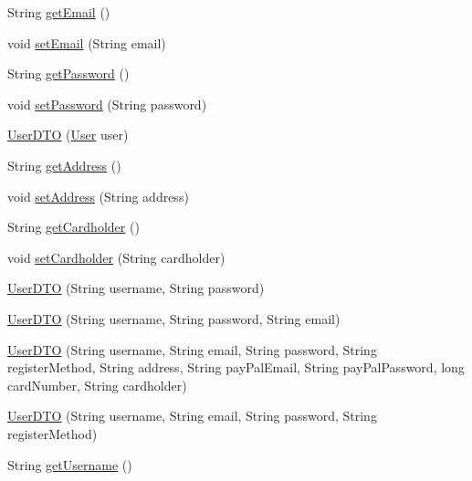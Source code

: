 \begin{DoxyCompactItemize}
\item 
String \mbox{\hyperlink{class_s_p_q_1_1dto_1_1_user_d_t_o_a67038ab8bab7cb7119ece00bcb20a360}{get\+Email}} ()
\item 
void \mbox{\hyperlink{class_s_p_q_1_1dto_1_1_user_d_t_o_a3e41397e229b7f0398232747d97d6d5e}{set\+Email}} (String email)
\item 
String \mbox{\hyperlink{class_s_p_q_1_1dto_1_1_user_d_t_o_a955f436e60336683283a6fcd6fc5f874}{get\+Password}} ()
\item 
void \mbox{\hyperlink{class_s_p_q_1_1dto_1_1_user_d_t_o_a35bd2d50e194e3d923e8adcf229e5a3e}{set\+Password}} (String password)
\item 
\mbox{\hyperlink{class_s_p_q_1_1dto_1_1_user_d_t_o_a40cad7b1dea2117ed4cb0e69fdc6b929}{User\+D\+TO}} (\mbox{\hyperlink{class_s_p_q_1_1data_1_1_user}{User}} user)
\item 
String \mbox{\hyperlink{class_s_p_q_1_1dto_1_1_user_d_t_o_a5234f9e12bcda79c32c4aec80de40ad2}{get\+Address}} ()
\item 
void \mbox{\hyperlink{class_s_p_q_1_1dto_1_1_user_d_t_o_a9ea48b87767eb765aac4f10d0cb9d53a}{set\+Address}} (String address)
\item 
String \mbox{\hyperlink{class_s_p_q_1_1dto_1_1_user_d_t_o_a82fe9a242f18d3cb62735cee648e71d9}{get\+Cardholder}} ()
\item 
void \mbox{\hyperlink{class_s_p_q_1_1dto_1_1_user_d_t_o_a3627efce4d0873f1e706e8ad65a28506}{set\+Cardholder}} (String cardholder)
\item 
\mbox{\hyperlink{class_s_p_q_1_1dto_1_1_user_d_t_o_ad73df6daa2dd8fc4615a5b154acc229b}{User\+D\+TO}} (String username, String password)
\item 
\mbox{\hyperlink{class_s_p_q_1_1dto_1_1_user_d_t_o_ad7df1249da1b9fdc0b383a4b96b50eae}{User\+D\+TO}} (String username, String password, String email)
\item 
\mbox{\hyperlink{class_s_p_q_1_1dto_1_1_user_d_t_o_ad9a6a079da473fe91114b91f0383196f}{User\+D\+TO}} (String username, String email, String password, String register\+Method, String address, String pay\+Pal\+Email, String pay\+Pal\+Password, long card\+Number, String cardholder)
\item 
\mbox{\hyperlink{class_s_p_q_1_1dto_1_1_user_d_t_o_a96eac4c18d86e06c5fd796e69322e5fb}{User\+D\+TO}} (String username, String email, String password, String register\+Method)
\item 
String \mbox{\hyperlink{class_s_p_q_1_1dto_1_1_user_d_t_o_a0cd335456c4f53b97069820475742980}{get\+Username}} ()

\end{DoxyCompactItemize}
